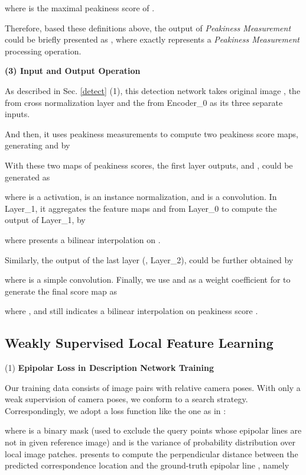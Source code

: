 \documentclass[journal]{IEEEtran}
\begin{document}
where  is the maximal peakiness score of .

Therefore, based these definitions above, the output of \emph{Peakiness Measurement} could be briefly presented as , where  exactly represents a \emph{Peakiness Measurement} processing operation.

\textbf{(3) Input and Output Operation}

As described in Sec. \ref{detect} (1), 
this detection network takes original image , the  from cross normalization layer and the  from Encoder\_0 as its three separate inputs. 

And then, it uses peakiness measurements  to compute two peakiness score maps, generating  and  by

With these two maps of peakiness scores, the first layer outputs,  and , could be generated as

where  is a  activation,  is an instance normalization, and  is a  convolution. In Layer\_1, it aggregates the feature maps  and  from Layer\_0 to compute the output of Layer\_1,  by

where  presents a bilinear interpolation on . 

Similarly, the output of the last layer (, Layer\_2),  could be further obtained by
 
where  is a simple  convolution. Finally, we use  and  as a weight coefficient for  to generate the final score map  as

where , and  still indicates a bilinear interpolation on peakiness score .


\subsection{Weakly Supervised Local Feature Learning} \label{loss}

(1) \textbf{Epipolar Loss in Description Network Training}

Our training data consists of image pairs with relative camera poses. With only a weak supervision of camera poses, we conform to a  search strategy. Correspondingly, we adopt a loss function like the one as in \cite{li2022decoupling}:

where  is a binary mask (used to exclude the query points whose epipolar lines are not in given reference image) and  is the variance of probability distribution over local image patches.  presents to compute the perpendicular distance between the predicted correspondence location  and the ground-truth epipolar line , namely 
\end{document}
